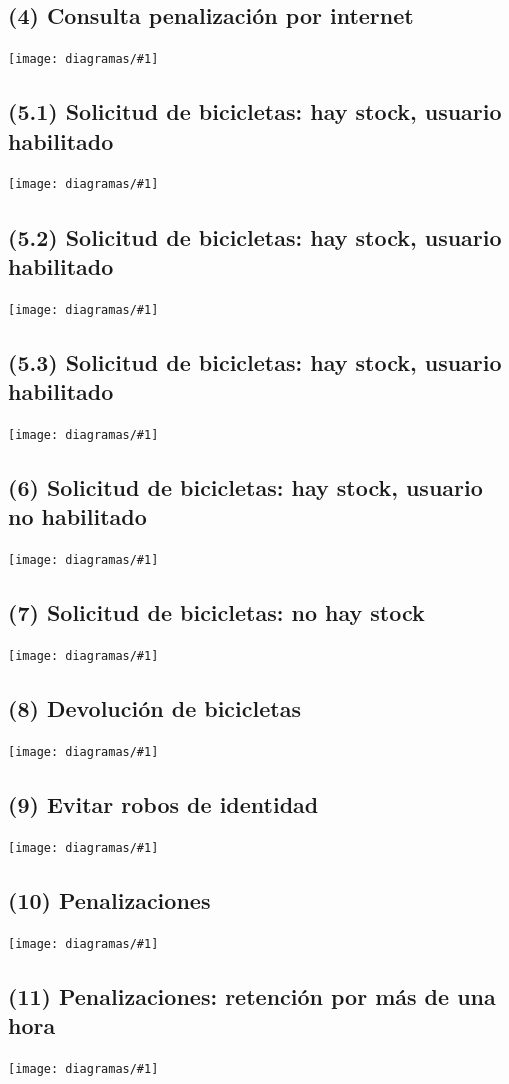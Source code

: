 \documentclass[a4paper, 10pt, twoside]{article}
\newcommand{\diagramav}[1]{
  \texttt{[image: diagramas/\#1]}
}
\newcommand{\diagramah}[1]{
  \texttt{[image: diagramas/\#1]}
}
\begin{document}
\subsection{(4)    Consulta penalización por internet}
\diagramah{objetivos-4}

\subsection{(5.1)  Solicitud de bicicletas: hay stock, usuario habilitado}
\diagramah{objetivos-5.1}

\subsection{(5.2)  Solicitud de bicicletas: hay stock, usuario habilitado}
\diagramah{objetivos-5.2}

\subsection{(5.3)  Solicitud de bicicletas: hay stock, usuario habilitado}
\diagramah{objetivos-5.3}

\subsection{(6)    Solicitud de bicicletas: hay stock, usuario no habilitado}
\diagramav{objetivos-6}

\subsection{(7)    Solicitud de bicicletas: no hay stock}
\diagramav{objetivos-7}

\subsection{(8)    Devolución de bicicletas}
\diagramah{objetivos-8}

\subsection{(9)    Evitar robos de identidad}
\diagramav{objetivos-9}

\subsection{(10)   Penalizaciones}
\diagramah{objetivos-10}

\subsection{(11)   Penalizaciones: retención por más de una hora}
\diagramah{objetivos-11}
\end{document}
